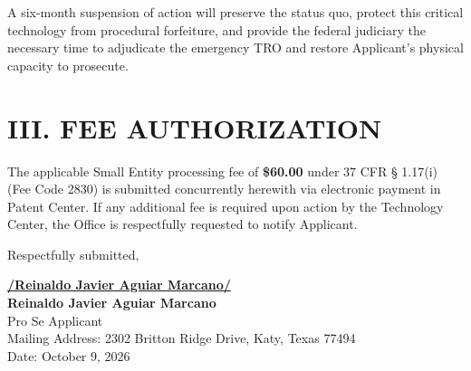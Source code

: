 \documentclass[11pt,letterpaper]{article}
\begin{document}
A six-month suspension of action will preserve the status quo, protect this critical technology from procedural forfeiture, and provide the federal judiciary the necessary time to adjudicate the emergency TRO and restore Applicant's physical capacity to prosecute.

\section*{III. FEE AUTHORIZATION}

The applicable Small Entity processing fee of \textbf{\$60.00} under 37 CFR \S{} 1.17(i) (Fee Code 2830) is submitted concurrently herewith via electronic payment in Patent Center. If any additional fee is required upon action by the Technology Center, the Office is respectfully requested to notify Applicant.

\vspace{0.3cm}
\begin{singlespace}
\noindent Respectfully submitted, \par\vspace{0.8cm}
\underline{\textbf{/Reinaldo Javier Aguiar Marcano/}} \\
\textbf{Reinaldo Javier Aguiar Marcano} \\
Pro Se Applicant \\
Mailing Address: 2302 Britton Ridge Drive, Katy, Texas 77494 \\
Date: October 9, 2026
\end{singlespace}
\end{document}
